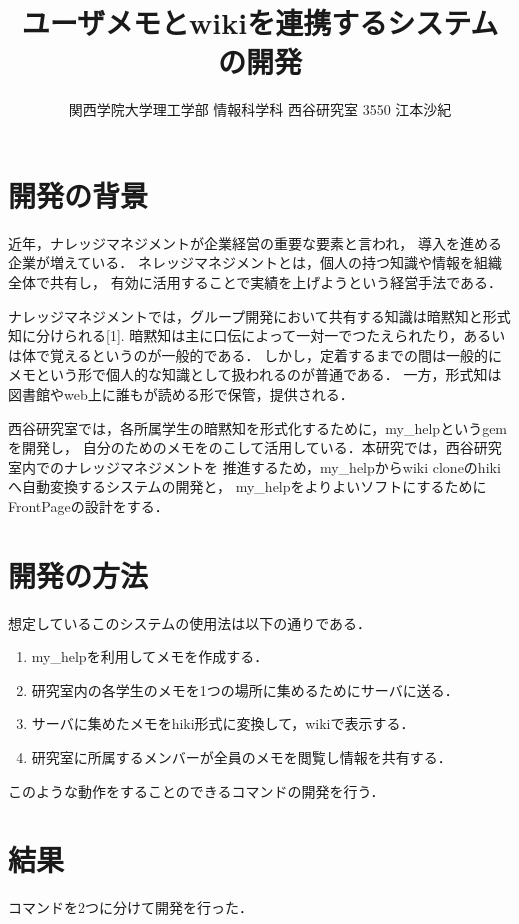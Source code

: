 \documentclass[10pt,a4j,twocolumn]{jsarticle}
\begin{document}
\title{ユーザメモとwikiを連携するシステムの開発}
\author{関西学院大学理工学部 情報科学科 西谷研究室 3550 江本沙紀}
\date{}
\maketitle
\section{開発の背景}
近年，ナレッジマネジメントが企業経営の重要な要素と言われ，
導入を進める企業が増えている．
ネレッジマネジメントとは，個人の持つ知識や情報を組織全体で共有し，
有効に活用することで実績を上げようという経営手法である．

ナレッジマネジメントでは，グループ開発において共有する知識は暗黙知と形式知に分けられる[1].
暗黙知は主に口伝によって一対一でつたえられたり，あるいは体で覚えるというのが一般的である．
しかし，定着するまでの間は一般的にメモという形で個人的な知識として扱われるのが普通である．
一方，形式知は図書館やweb上に誰もが読める形で保管，提供される．

西谷研究室では，各所属学生の暗黙知を形式化するために，my\_helpというgemを開発し，
自分のためのメモをのこして活用している．本研究では，西谷研究室内でのナレッジマネジメントを
推進するため，my\_helpからwiki cloneのhikiへ自動変換するシステムの開発と，
my\_helpをよりよいソフトにするためにFrontPageの設計をする．

\section{開発の方法}
想定しているこのシステムの使用法は以下の通りである．

\begin{enumerate}
\item my\_helpを利用してメモを作成する．
\item 研究室内の各学生のメモを1つの場所に集めるためにサーバに送る．
\item サーバに集めたメモをhiki形式に変換して，wikiで表示する．
\item 研究室に所属するメンバーが全員のメモを閲覧し情報を共有する．
\end{enumerate}
このような動作をすることのできるコマンドの開発を行う．

\section{結果}
コマンドを2つに分けて開発を行った．
\end{document}
